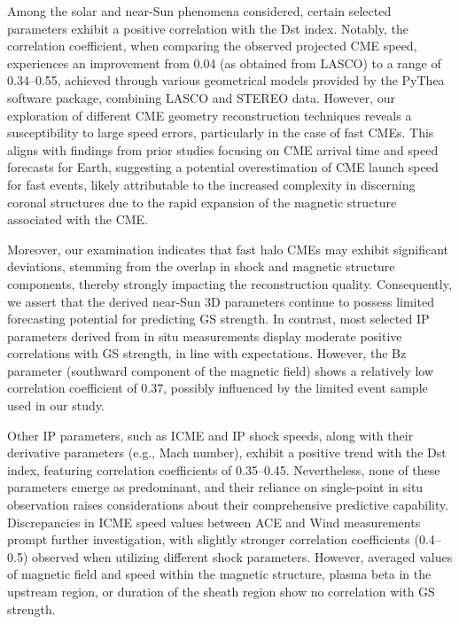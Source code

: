 Among the solar and near-Sun phenomena considered, certain selected parameters exhibit a positive correlation with the Dst index. Notably, the correlation coefficient, when comparing the observed projected CME speed, experiences an improvement from 0.04 (as obtained from LASCO) to a range of 0.34–0.55, achieved through various geometrical models provided by the PyThea software package, combining LASCO and STEREO data. However, our exploration of different CME geometry reconstruction techniques reveals a susceptibility to large speed errors, particularly in the case of fast CMEs. This aligns with findings from prior studies focusing on CME arrival time and speed forecasts for Earth, suggesting a potential overestimation of CME launch speed for fast events, likely attributable to the increased complexity in discerning coronal structures due to the rapid expansion of the magnetic structure associated with the CME.

Moreover, our examination indicates that fast halo CMEs may exhibit significant deviations, stemming from the overlap in shock and magnetic structure components, thereby strongly impacting the reconstruction quality. Consequently, we assert that the derived near-Sun 3D parameters continue to possess limited forecasting potential for predicting GS strength. In contrast, most selected IP parameters derived from in situ measurements display moderate positive correlations with GS strength, in line with expectations. However, the Bz parameter (southward component of the magnetic field) shows a relatively low correlation coefficient of 0.37, possibly influenced by the limited event sample used in our study.

Other IP parameters, such as ICME and IP shock speeds, along with their derivative parameters (e.g., Mach number), exhibit a positive trend with the Dst index, featuring correlation coefficients of 0.35–0.45. Nevertheless, none of these parameters emerge as predominant, and their reliance on single-point in situ observation raises considerations about their comprehensive predictive capability. Discrepancies in ICME speed values between ACE and Wind measurements prompt further investigation, with slightly stronger correlation coefficients (0.4–0.5) observed when utilizing different shock parameters. However, averaged values of magnetic field and speed within the magnetic structure, plasma beta in the upstream region, or duration of the sheath region show no correlation with GS strength.

